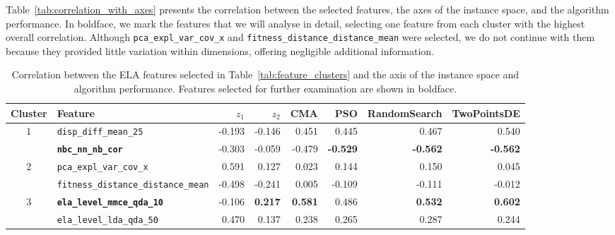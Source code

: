\documentclass[acmsmall,screen,review,anonymous]{acmart}
\begin{document}
Table~\ref{tab:correlation_with_axes} presents the correlation between the selected features, the axes of the instance space, and the algorithm performance. In boldface, we mark the features that we will analyse in detail, selecting one feature from each cluster with the highest overall correlation. Although {\tt pca\_expl\_var\_cov\_x} and {\tt fitness\_distance\_distance\_mean} were selected, we do not continue with them because they provided little variation within dimensions, offering negligible additional information.

%
\begin{table}[!t]
	\centering
	\caption{Correlation between the ELA features selected in Table~\ref{tab:feature_clusters} and the axis of the instance space and algorithm performance. Features selected for further examination are shown in boldface.}
	\footnotesize
	\begin{tabular}{clrrrrrr}
        \toprule
        Cluster & Feature                                    & $z_{1}$        & $z_{2}$        & CMA            & PSO             & RandomSearch    & TwoPointsDE     \\
        \midrule
        \multirow{2}{*}{1} & {\tt disp\_diff\_mean\_25}                       & -0.193          & -0.146          & 0.451          & 0.445           & 0.467           & 0.540  \\
         & {\tt \textbf{nbc\_nn\_nb\_cor}}                  & -0.303 & -0.059          & -0.479         & \textbf{-0.529} & \textbf{-0.562} & \textbf{-0.562} \\ \midrule

        \multirow{2}{*}{2} & {\tt pca\_expl\_var\_cov\_x}                     & 0.591  & 0.127           & 0.023          & 0.144           & 0.150           & 0.045           \\
         & {\tt {fitness\_distance\_distance\_mean}} & {-0.498} & {-0.241} & 0.005          & -0.109          & -0.111          & -0.012 \\ \midrule

        \multirow{2}{*}{3} & {\tt \textbf{ela\_level\_mmce\_qda\_10}}         & -0.106          & \textbf{0.217}  & \textbf{0.581} & 0.486           & \textbf{0.532}  & \textbf{0.602}  \\
         & {\tt ela\_level\_lda\_qda\_50}                   & 0.470           & 0.137           & 0.238          & 0.265           & 0.287           & 0.244           \\ \midrule
        

\end{tabular}
\end{table}
\end{document}
